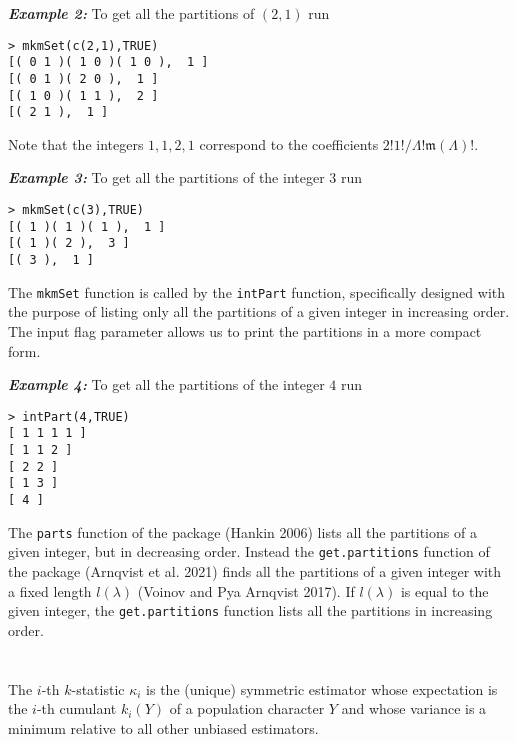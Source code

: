 \hskip-0.5cm\textbf{\emph{Example 2:}} To get all the partitions of \((2,1)\) run

\begin{verbatim}
> mkmSet(c(2,1),TRUE)
[( 0 1 )( 1 0 )( 1 0 ),  1 ]
[( 0 1 )( 2 0 ),  1 ]
[( 1 0 )( 1 1 ),  2 ]   
[( 2 1 ),  1 ] 
\end{verbatim}

\hskip-0.5cm Note that the integers \(1,1,2,1\) correspond to the coefficients \(2! 1!/\Lambda! \mathfrak{m}(\Lambda)!.\)

\hskip-0.5cm\textbf{\emph{Example 3:}} To get all the partitions of the integer \(3\) run

\begin{verbatim}
> mkmSet(c(3),TRUE)
[( 1 )( 1 )( 1 ),  1 ]
[( 1 )( 2 ),  3 ]
[( 3 ),  1 ]
\end{verbatim}

The \texttt{mkmSet} function is called by the \texttt{intPart} function, specifically designed with the purpose of listing only all the partitions of a given integer in increasing order. The input flag parameter allows us to print the partitions in a more compact form.

\hskip-0.5cm\textbf{\emph{Example 4:}} To get all the partitions of the integer \(4\) run

\begin{verbatim}
> intPart(4,TRUE)
[ 1 1 1 1 ]
[ 1 1 2 ]
[ 2 2 ]
[ 1 3 ]
[ 4 ]
\end{verbatim}

The \texttt{parts} function of the  package (Hankin 2006) lists all the partitions of a given integer, but in decreasing order. Instead the \texttt{get.partitions} function of the  package (Arnqvist et al. 2021) finds all the partitions of a given integer with a fixed length \(l(\lambda)\) (Voinov and Pya Arnqvist 2017). If \(l(\lambda)\) is equal to the given integer, the \texttt{get.partitions} function lists all the partitions in increasing order.

\hypertarget{section}{%
\section{\texorpdfstring{}{}}\label{section}}

The \(i\)-th \(k\)-statistic \(\kappa_i\) is the (unique) symmetric estimator whose expectation is the \(i\)-th cumulant \(k_i(Y)\) of a population character \(Y\) and whose variance is a minimum relative to all other unbiased estimators.

